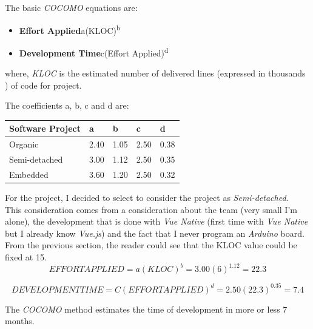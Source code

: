 The basic \textit{COCOMO} equations are:
\begin{itemize}
    \item \textbf{Effort Applied}\quad a(KLOC)\textsuperscript{b}
    \item \textbf{Development Time}\quad c(Effort Applied)\textsuperscript{d}
\end{itemize}

where, \textit{KLOC} is the estimated number of delivered lines (expressed in thousands ) of code for project.\\
\clearpage

The coefficients a, b, c and d are:
\begin{table}[H]
\begin{tabular}{| p{} | p{} | p{} | p{} | p{} |}
  \hline
  \textbf{Software Project} & \textbf{a} & \textbf{b} & \textbf{c} & \textbf{d}\\ \hline
  Organic       & 2.40 & 1.05 & 2.50 & 0.38 \\ \hline
  Semi-detached & 3.00 & 1.12 & 2.50 & 0.35 \\ \hline
  Embedded      & 3.60 & 1.20 & 2.50 & 0.32 \\ \hline
\end{tabular}
\end{table}

For the project, I decided to select to consider the project as \textit{Semi-detached}.\\
This consideration comes from a consideration about the team (very small I'm alone), the development that is done with \textit{Vue Native} (first time with \textit{Vue Native} but I already know \textit{Vue.js}) and the fact that I never program an \textit{Arduino} board.\\

From the previous section, the reader could see that the KLOC value could be fixed at 15.\\

\[
EFFORT APPLIED = a\left ( KLOC \right ) ^{b} =  3.00 \left ( 6 \right ) ^{1.12} = 22.3
\]

\[
DEVELOPMENT TIME = C\left ( EFFORT APPLIED \right ) ^{d} =  2.50 \left ( 22.3 \right ) ^{0.35} = 7.4
\]

The \textit{COCOMO} method estimates the time of development in more or less 7 months.

